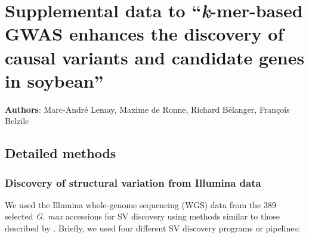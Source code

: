 \documentclass[12pt]{report}
\begin{document}
\chapter*{Supplemental data to ``\textit{k}-mer-based GWAS enhances the discovery of causal variants and candidate genes in soybean''}
\label{supdata}

\renewcommand\thefigure{S\arabic{figure}} 
\setcounter{figure}{0}
\setcounter{table}{0}
\renewcommand\thetable{S\arabic{table}} 

\newcommand{\getvar}[1]{\DTLfetch{variables}{key}{#1}{value}}

\setcounter{page}{1}

\textbf{Authors}: Marc-André Lemay, Maxime de Ronne, Richard Bélanger, François Belzile

\section*{Detailed methods}
\label{annexe-sv-gwas-detailed-methods}

\subsection*{Discovery of structural variation from Illumina data}
\label{sv-gwas-sv-discovery-illumina}

We used the Illumina whole-genome sequencing (WGS) data from the 389 selected \emph{G. max} accessions
for SV discovery using methods similar to those described by
\cite{lemay2022}.  Briefly, we used four different SV discovery programs or
pipelines: 
\end{document}
